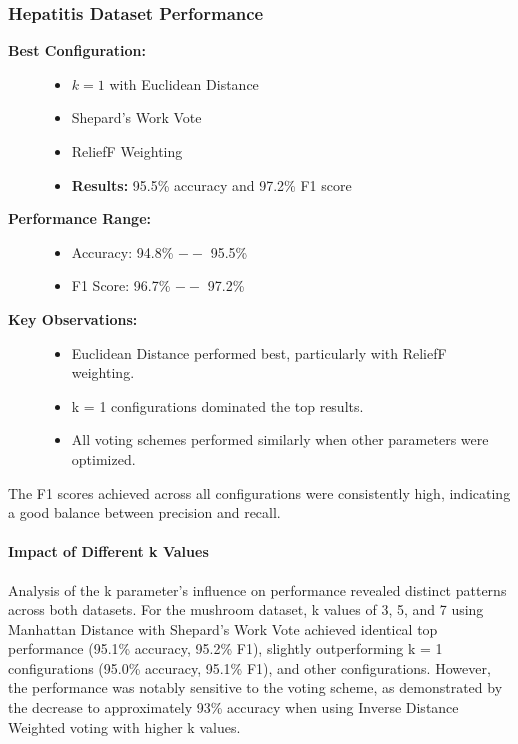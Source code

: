 \subsubsection*{Hepatitis Dataset Performance}

\begin{description}
    \item[\textbf{Best Configuration:}]\leavevmode
        \begin{itemize}
            \item $k = 1$ with Euclidean Distance
            \item Shepard's Work Vote
            \item ReliefF Weighting
            \item \textbf{Results:} 95.5\% accuracy and 97.2\% F1 score
        \end{itemize}
    
    \item[\textbf{Performance Range:}]\leavevmode
        \begin{itemize}
            \item Accuracy: 94.8\% $--$ 95.5\%
            \item F1 Score: 96.7\% $--$ 97.2\%
        \end{itemize}
    
    \item[\textbf{Key Observations:}]\leavevmode
        \begin{itemize}
            \item Euclidean Distance performed best, particularly with ReliefF weighting.
            \item k = 1 configurations dominated the top results.
            \item All voting schemes performed similarly when other parameters were optimized.
        \end{itemize}
\end{description}

The F1 scores achieved across all configurations were consistently high, indicating a good balance between precision and recall.

\paragraph{Impact of Different k Values}
Analysis of the k parameter's influence on performance revealed distinct patterns across both datasets.
For the mushroom dataset, k values of 3, 5, and 7 using Manhattan Distance with Shepard's Work Vote achieved identical top performance
(95.1\% accuracy, 95.2\% F1), slightly outperforming k = 1 configurations (95.0\% accuracy, 95.1\% F1), and other configurations.
However, the performance was notably sensitive to the voting scheme, as demonstrated by the decrease to approximately 93\% accuracy
when using Inverse Distance Weighted voting with higher k values.

